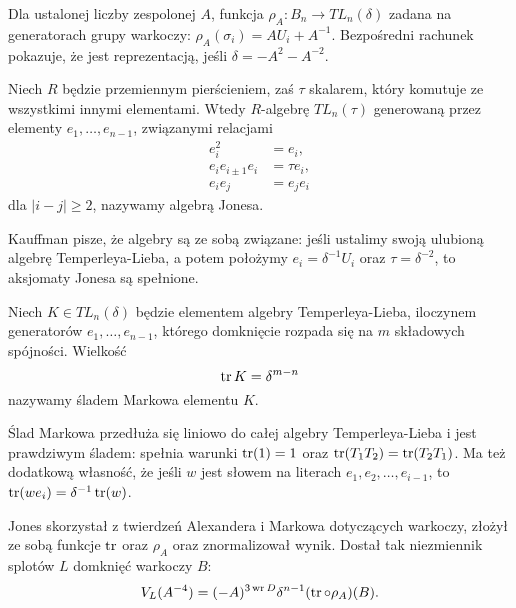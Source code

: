 Dla ustalonej liczby zespolonej $A$, funkcja $\rho_A \colon B_n \to TL_n(\delta)$ zadana na generatorach grupy warkoczy: $\rho_A(\sigma_i) = AU_i + A^{-1}$.
Bezpośredni rachunek pokazuje, że jest reprezentacją, jeśli $\delta = -A^2-A^{-2}$.

\begin{definition}
%
    Niech $R$ będzie przemiennym pierścieniem, zaś $\tau$ skalarem, który komutuje ze wszystkimi innymi elementami.
    Wtedy $R$-algebrę $TL_n(\tau)$ generowaną przez elementy $e_1, \ldots, e_{n-1}$, związanymi relacjami
    \begin{align}
        e_i^2 & = e_i, \\
        e_i e_{i \pm 1} e_i & = \tau e_i, \\
        e_i e_j & = e_j e_i
    \end{align}
    dla $|i-j| \ge 2$, nazywamy algebrą Jonesa.
\end{definition}

Kauffman pisze, że algebry są ze sobą związane: jeśli ustalimy swoją ulubioną algebrę Temperleya-Lieba, a potem położymy $e_i = \delta^{-1} U_i$ oraz $\tau = \delta^{-2}$, to aksjomaty Jonesa są spełnione.

\begin{definition}
%
    Niech $K \in TL_n(\delta)$ będzie elementem algebry Temperleya-Lieba, iloczynem generatorów $e_1, \ldots, e_{n-1}$, którego domknięcie rozpada się na $m$ składowych spójności.
    Wielkość
    \begin{equation}
        \operatorname{tr} K = \delta^{m-n}
    \end{equation}
    nazywamy śladem Markowa elementu $K$.
\end{definition}

Ślad Markowa przedłuża się liniowo do całej algebry Temperleya-Lieba i jest prawdziwym śladem: spełnia warunki $\operatorname{tr} (1) = 1$ oraz $\operatorname{tr} (T_1T_2) = \operatorname{tr} (T_2T_1)$.
Ma też dodatkową własność, że jeśli $w$ jest słowem na literach $e_1, e_2, \ldots, e_{i-1}$, to $\operatorname{tr}(we_i) = \delta^{-1} \operatorname{tr} (w)$.

Jones skorzystał z twierdzeń Alexandera i Markowa dotyczących warkoczy, złożył ze sobą funkcje $\operatorname{tr}$ oraz $\rho_A$ oraz znormalizował wynik.
%
%
Dostał tak niezmiennik splotów $L$ domknięć warkoczy $B$:
\begin{equation}
    V_L(A^{-4}) = (-A)^{3 \operatorname{wr} D} \delta^{n-1} (\operatorname{tr} \circ \rho_A)(B).
\end{equation}


